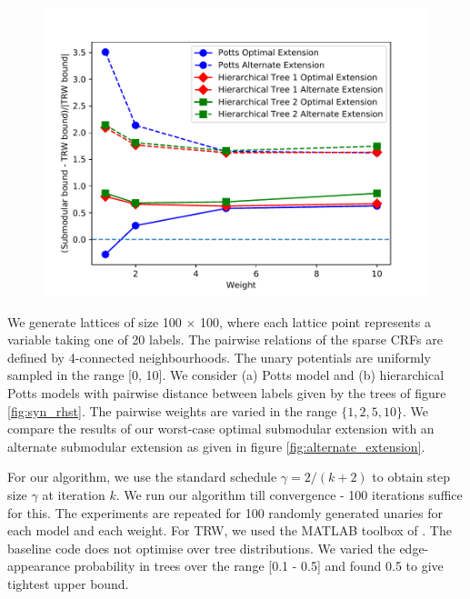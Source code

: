 \begin{figure}
\centering
\includegraphics[scale = 0.50]{./figures/synthetic_upper_bound_comparison.pdf}
\label{fig:syn_plot}
\end{figure}


\label{subsec:synthetic}
 We generate lattices of size 100 $\times$ 100, where each
lattice point represents a variable taking one of 20 labels. The pairwise
relations of the sparse CRFs are defined by 4-connected neighbourhoods. The
unary potentials are uniformly sampled in the range [0, 10]. We consider (a)
Potts model and (b) hierarchical Potts models with pairwise distance between
labels given by the trees of figure \ref{fig:syn_rhst}. The pairwise weights
are varied in the range $\{1, 2, 5, 10\}$. We compare the results of
our worst-case optimal submodular extension with an alternate submodular
extension as given in figure \ref{fig:alternate_extension}.

 For our algorithm, we use the standard schedule $\gamma = 2/(k + 2)$ to obtain step size $\gamma$ at iteration $k$. We run our algorithm till convergence - 100 iterations suffice for this. The experiments are repeated for 100 randomly generated unaries for each model and each weight. For TRW, we used the MATLAB toolbox of \citep{domke2013learning}. The baseline code does not optimise over tree distributions. We varied the edge-appearance probability in trees over the range [0.1 - 0.5] and found 0.5 to give tightest upper bound.


